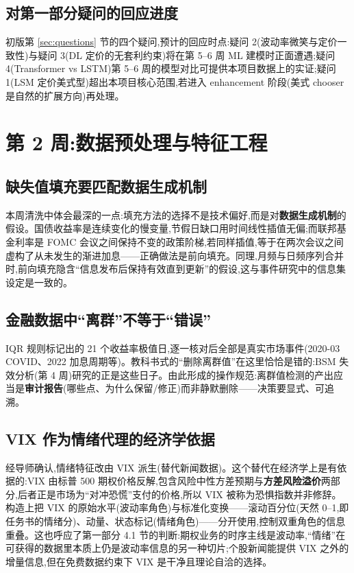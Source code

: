 \documentclass[11pt]{ctexart}
\begin{document}
\subsection{对第一部分疑问的回应进度}
初版第 \ref{sec:questions} 节的四个疑问,预计的回应时点:疑问 2(波动率微笑与定价一致性)与疑问 3(DL 定价的无套利约束)将在第 5--6 周 ML 建模时正面遭遇;疑问 4(Transformer vs LSTM)第 5--6 周的模型对比可提供本项目数据上的实证;疑问 1(LSM 定价美式型)超出本项目核心范围,若进入 enhancement 阶段(美式 chooser 是自然的扩展方向)再处理。


\section{第 2 周:数据预处理与特征工程}

\subsection{缺失值填充要匹配数据生成机制}
本周清洗中体会最深的一点:填充方法的选择不是技术偏好,而是对\textbf{数据生成机制}的假设。国债收益率是连续变化的慢变量,节假日缺口用时间线性插值无偏;而联邦基金利率是 FOMC 会议之间保持不变的政策阶梯,若同样插值,等于在两次会议之间虚构了从未发生的渐进加息——正确做法是前向填充。同理,月频与日频序列合并时,前向填充隐含``信息发布后保持有效直到更新''的假设,这与事件研究中的信息集设定是一致的。

\subsection{金融数据中``离群''不等于``错误''}
IQR 规则标记出的 21 个收益率极值日,逐一核对后全部是真实市场事件(2020-03 COVID、2022 加息周期等)。教科书式的``删除离群值''在这里恰恰是错的:BSM 失效分析(第 4 周)研究的正是这些日子。由此形成的操作规范:离群值检测的产出应当是\textbf{审计报告}(哪些点、为什么保留/修正)而非静默删除——决策要显式、可追溯。

\subsection{VIX 作为情绪代理的经济学依据}
经导师确认,情绪特征改由 VIX 派生(替代新闻数据)。这个替代在经济学上是有依据的:VIX 由标普 500 期权价格反解,包含风险中性方差预期与\textbf{方差风险溢价}两部分,后者正是市场为``对冲恐慌''支付的价格,所以 VIX 被称为恐惧指数并非修辞。构造上把 VIX 的原始水平(波动率角色)与标准化变换——滚动百分位(天然 0--1,即任务书的情绪分)、动量、状态标记(情绪角色)——分开使用,控制双重角色的信息重叠。这也呼应了第一部分 4.1 节的判断:期权业务的时序主线是波动率,``情绪''在可获得的数据里本质上仍是波动率信息的另一种切片;个股新闻能提供 VIX 之外的增量信息,但在免费数据约束下 VIX 是干净且理论自洽的选择。
\end{document}
